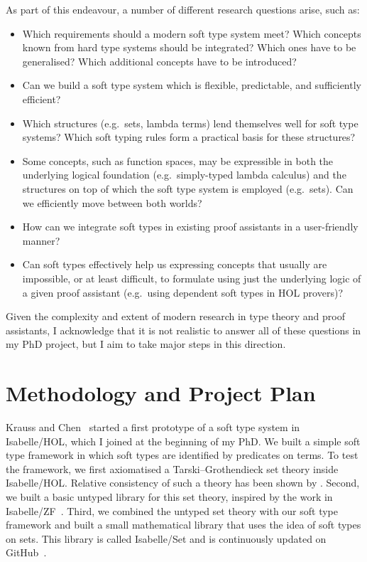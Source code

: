 \documentclass[a4paper, 12pt]{article}
\theoremstyle{plain}
\theoremstyle{definition}
\begin{document}
As part of this endeavour, a number of different research questions arise, such as:
\begin{itemize}
\item Which requirements should a modern soft type system meet?
  Which concepts known from hard type systems should be integrated?
  Which ones have to be generalised?
  Which additional concepts have to be introduced?
\item Can we build a soft type system which is flexible, predictable, and sufficiently efficient?
\item Which structures (e.g.\ sets, lambda terms) lend themselves well for soft type systems? Which soft typing rules form a practical basis for these structures?
\item Some concepts, such as function spaces, may be expressible in both the underlying logical foundation (e.g.\ simply-typed lambda calculus) and the structures on top of which the soft type system is employed (e.g.\ sets).
  Can we efficiently move between both worlds?
\item How can we integrate soft types in existing proof assistants in a user-friendly manner?
\item Can soft types effectively help us expressing concepts that usually are impossible, or at least difficult,
  to formulate using just the underlying logic of a given proof assistant
  (e.g.\ using dependent soft types in HOL provers)?
\end{itemize}
Given the complexity and extent of modern research in type theory and proof assistants,
I acknowledge that it is not realistic to answer all of these questions
in my PhD project,
but I aim to take major steps in this direction.

\section{Methodology and Project Plan}

Krauss and Chen~\cite{isabelleset} started a first prototype of
a soft type system in Isabelle/HOL,
which I joined at the beginning of my PhD.
We built a simple soft type framework in which soft types
are identified by predicates on terms.
To test the framework,
we first axiomatised a Tarski–Grothendieck set theory
inside Isabelle/HOL.
Relative consistency of such a theory
has been shown by \citet{brown2019higher}.
Second, we built a basic untyped library for this
set theory, inspired by the work in Isabelle/ZF~\cite{isabellezf}.
Third, we combined the untyped set theory with
our soft type framework and built a small mathematical library that uses the idea of soft types on sets.
This library is called Isabelle/Set and is continuously updated on GitHub~\cite{isabelleset}.
\end{document}
